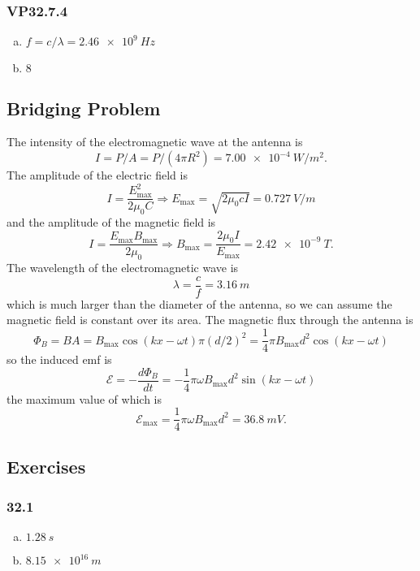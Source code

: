 \documentclass{article}
\begin{document}
\subsubsection{VP32.7.4}

\begin{enumerate}[(a)]
  \item $f = c / \lambda = \qty{2.46e9}{Hz}$

  \item $8$
\end{enumerate}

\subsection{Bridging Problem}

The intensity of the electromagnetic wave at the antenna is \[I = P / A = P / (4 \pi R^2) = \qty{7.00e-4}{W/m^2}.\] The amplitude of the electric field is \[I = \frac{E_\text{max}^2}{2 \mu_0 C} \Rightarrow E_\text{max} = \sqrt{2 \mu_0 c I} = \qty{0.727}{V/m}\] and the amplitude of the magnetic field is \[I = \frac{E_\text{max} B_\text{max}}{2 \mu_0} \Rightarrow B_\text{max} = \frac{2 \mu_0 I}{E_\text{max}} = \qty{2.42e-9}{T}.\] The wavelength of the electromagnetic wave is \[\lambda = \frac{c}{f} = \qty{3.16}{m}\] which is much larger than the diameter of the antenna, so we can assume the magnetic field is constant over its area. The magnetic flux through the antenna is \[\Phi_B = B A = B_\text{max} \cos (k x - \omega t) \pi (d / 2)^2 = \frac{1}{4} \pi B_\text{max} d^2 \cos (k x - \omega t)\] so the induced emf is \[\mathcal{E} = -\frac{d \Phi_B}{dt} = -\frac{1}{4} \pi \omega B_\text{max} d^2 \sin (k x - \omega t)\] the maximum value of which is \[\mathcal{E}_\text{max} = \frac{1}{4} \pi \omega B_\text{max} d^2 = \qty{36.8}{mV}.\]

\subsection{Exercises}

\subsubsection{32.1}

\begin{enumerate}[(a)]
  \item $\qty{1.28}{s}$

  \item $\qty{8.15e16}{m}$
\end{enumerate}
\end{document}
